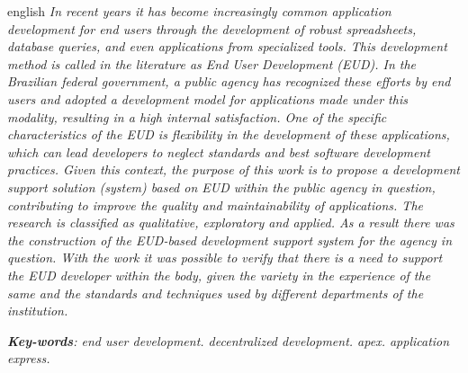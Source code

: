 \begin{resumo}[Abstract]
 \begin{otherlanguage*}{english}
   \textit{In recent years it has become increasingly common application development for end users through the development of robust spreadsheets, database queries, and even applications from specialized tools. This development method is called in the literature as End User Development (EUD). In the Brazilian federal government, a public agency has recognized these efforts by end users and adopted a development model for applications made under this modality, resulting in a high internal satisfaction. One of the specific characteristics of the EUD is flexibility in the development of these applications, which can lead developers to neglect standards and best software development practices. Given this context, the purpose of this work is to propose a development support solution (system) based on EUD within the public agency in question, contributing to improve the quality and maintainability of applications. The research is classified as qualitative, exploratory and applied. As a result there was the construction of the EUD-based development support system for the agency in question. With the work it was possible to verify that there is a need to support the EUD developer within the body, given the variety in the experience of the same and the standards and techniques used by different departments of the institution.}

   \vspace{\onelineskip}
 
   \noindent 
   \textit{\textbf{Key-words}: end user development. decentralized development. apex. application express.}
 \end{otherlanguage*}
\end{resumo}
